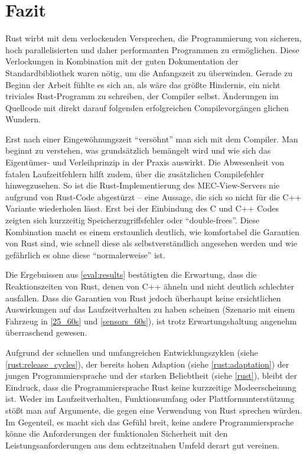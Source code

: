 \chapter{Fazit}


Rust wirbt mit dem verlockenden Versprechen, die Programmierung von sicheren, hoch parallelisierten und daher performanten Programmen zu ermöglichen.
Diese Verlockungen in Kombination mit der guten Dokumentation der Standardbibliothek waren nötig, um die Anfangszeit zu überwinden.
Gerade zu Beginn der Arbeit fühlte es sich an, als wäre das größte Hindernis, ein nicht triviales Rust-Programm zu schreiben, der Compiler selbst.
Änderungen im Quellcode mit direkt darauf folgenden erfolgreichen Compilevorgängen glichen Wundern.

Erst nach einer Eingewöhnungszeit \enquote{versöhnt} man sich mit dem Compiler.
Man beginnt zu verstehen, was grundsätzlich bemängelt wird und wie sich das Eigentümer- und Verleihprinzip in der Praxis auswirkt.
Die Abwesenheit von fatalen Laufzeitfehlern hilft zudem, über die zusätzlichen Compilefehler hinwegzusehen.
So ist die Rust-Implementierung des MEC-View-Servers nie aufgrund von Rust-Code abgestürzt -- eine Aussage, die sich so nicht für die C++ Variante wiederholen lässt.
Erst bei der Einbindung des C und C++ Codes zeigten sich kurzzeitig Speicherzugriffsfehler oder \enquote{double-frees}.
Diese Kombination macht es einem erstaunlich deutlich, wie komfortabel die Garantien von Rust sind, wie schnell diese als selbstverständlich angesehen werden und wie gefährlich es ohne diese \enquote{normalerweise} ist.

Die Ergebnissen aus \autoref{eval:results} bestätigten die Erwartung, dass die Reaktionszeiten von Rust, denen von C++ ähneln und nicht deutlich schlechter ausfallen.
Dass die Garantien von Rust jedoch überhaupt keine ersichtlichen Auswirkungen auf das Laufzeitverhalten zu haben scheinen (Szenario mit einem Fahrzeug in \autoref{25_60s} und \autoref{sensors_60s}), ist trotz Erwartungshaltung angenehm überraschend gewesen.

Aufgrund der schnellen und umfangreichen Entwicklungszyklen (siehe \autoref{rust:release_cycles}), der bereits hohen Adaption (siehe \autoref{rust:adaptation}) der jungen Programmiersprache und der starken Beliebtheit (siehe \autoref{rust}), bleibt der Eindruck, dass die Programmiersprache Rust keine kurzzeitige Modeerscheinung ist.
Weder im Laufzeitverhalten, Funktionsumfang oder Plattformunterstützung stößt man auf Argumente, die gegen eine Verwendung von Rust sprechen würden.
Im Gegenteil, es macht sich das Gefühl breit, keine andere Programmiersprache könne die Anforderungen der funktionalen Sicherheit mit den Leistungsanforderungen aus dem echtzeitnahen Umfeld derart gut vereinen.

